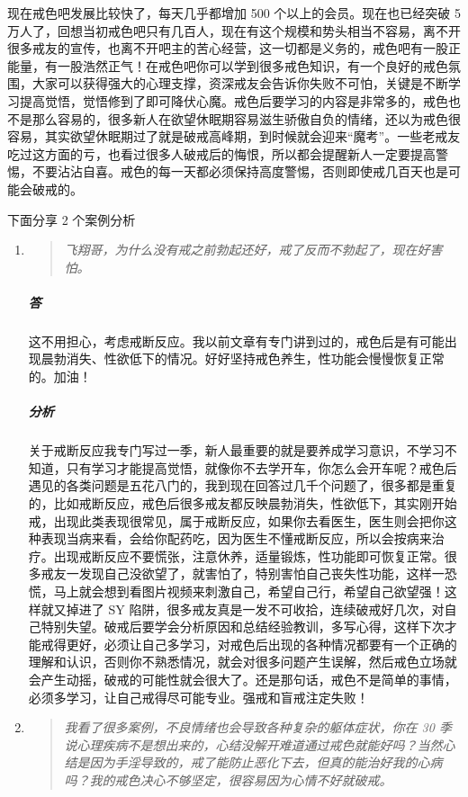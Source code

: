 \documentclass[fontset=founder]{ctexart}
\begin{document}
现在戒色吧发展比较快了，每天几乎都增加 500 个以上的会员。现在也已经突破 5 万人了，回想当初戒色吧只有几百人，现在有这个规模和势头相当不容易，离不开很多戒友的宣传，也离不开吧主的苦心经营，这一切都是义务的，戒色吧有一股正能量，有一股浩然正气！在戒色吧你可以学到很多戒色知识，有一个良好的戒色氛围，大家可以获得强大的心理支撑，资深戒友会告诉你失败不可怕，关键是不断学习提高觉悟，觉悟修到了即可降伏心魔。戒色后要学习的内容是非常多的，戒色也不是那么容易的，很多新人在欲望休眠期容易滋生骄傲自负的情绪，还以为戒色很容易，其实欲望休眠期过了就是破戒高峰期，到时候就会迎来“魔考”。一些老戒友吃过这方面的亏，也看过很多人破戒后的悔恨，所以都会提醒新人一定要提高警惕，不要沾沾自喜。戒色的每一天都必须保持高度警惕，否则即使戒几百天也是可能会破戒的。

下面分享 2 个案例分析

\begin{enumerate}
    \item \begin{quote}\it
        飞翔哥，为什么没有戒之前勃起还好，戒了反而不勃起了，现在好害怕。
    \end{quote}
    \subparagraph{答} 这不用担心，考虑戒断反应。我以前文章有专门讲到过的，戒色后是有可能出现晨勃消失、性欲低下的情况。好好坚持戒色养生，性功能会慢慢恢复正常的。加油！
    \subparagraph{分析} 关于戒断反应我专门写过一季，新人最重要的就是要养成学习意识，不学习不知道，只有学习才能提高觉悟，就像你不去学开车，你怎么会开车呢？戒色后遇见的各类问题是五花八门的，我到现在回答过几千个问题了，很多都是重复的，比如戒断反应，戒色后很多戒友都反映晨勃消失，性欲低下，其实刚开始戒，出现此类表现很常见，属于戒断反应，如果你去看医生，医生则会把你这种表现当病来看，会给你配药吃，因为医生不懂戒断反应，所以会按病来治疗。出现戒断反应不要慌张，注意休养，适量锻炼，性功能即可恢复正常。很多戒友一发现自己没欲望了，就害怕了，特别害怕自己丧失性功能，这样一恐慌，马上就会想到看图片视频来刺激自己，希望自己行，希望自己欲望强！这样就又掉进了 SY 陷阱，很多戒友真是一发不可收拾，连续破戒好几次，对自己特别失望。破戒后要学会分析原因和总结经验教训，多写心得，这样下次才能戒得更好，必须让自己多学习，对戒色后出现的各种情况都要有一个正确的理解和认识，否则你不熟悉情况，就会对很多问题产生误解，然后戒色立场就会产生动摇，破戒的可能性就会很大了。还是那句话，戒色不是简单的事情，必须多学习，让自己戒得尽可能专业。强戒和盲戒注定失败！
    \item \begin{quote}\it
        我看了很多案例，不良情绪也会导致各种复杂的躯体症状，你在 30 季说心理疾病不是想出来的，心结没解开难道通过戒色就能好吗？当然心结是因为手淫导致的，戒了能防止恶化下去，但真的能治好我的心病吗？我的戒色决心不够坚定，很容易因为心情不好就破戒。

\end{quote}
\end{enumerate}
\end{document}
